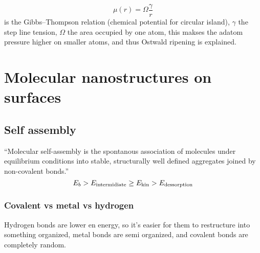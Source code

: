 \documentclass[article,oneside]{memoir}
\begin{document}
$$\mu(r)=\Omega\frac{\gamma}{r}$$ is the Gibbs--Thompson relation (chemical potential for circular island), $\gamma$ the step line tension, $\Omega$ the area occupied by one atom, this makses the adatom pressure higher on smaller atoms, and thus Ostwald ripening is explained.

\part{Molecular nanostructures on surfaces}

\chapter{Self assembly}
``Molecular self-assembly is the spontanous association of
molecules under equilibrium conditions into stable, structurally
well defined aggregates joined by non-covalent bonds.''
\begin{equation*}
        E_b> E_{\textup{intermidiate}}\geq E_{\textup{kin}} > E_{\textup{dessorption}}
\end{equation*}


\section{Covalent  vs metal vs hydrogen}
Hydrogen bonds are lower en energy, so it's easier for them to restructure into something organized, metal bonds are semi organized, and covalent bonds are completely random.

\end{document}
